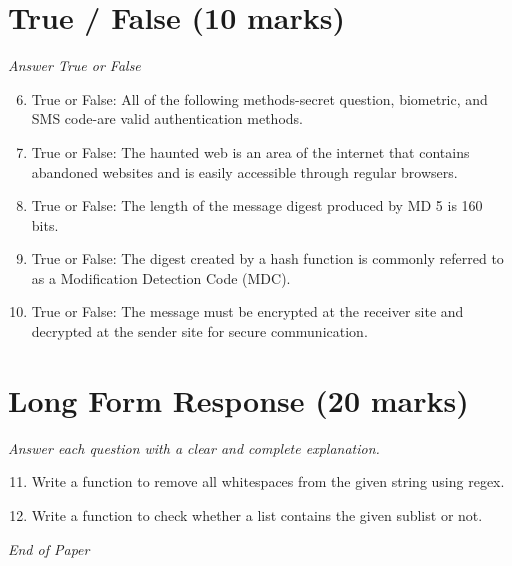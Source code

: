 \documentclass[12pt]{article}
\begin{document}
\section*{True / False (10 marks)}
\textit{Answer True or False}
\begin{enumerate}[label=\arabic*.]
\setcounter{enumi}{5}
\item True or False: All of the following methods-secret question, biometric, and SMS code-are valid authentication methods.
\item True or False: The haunted web is an area of the internet that contains abandoned websites and is easily accessible through regular browsers.
\item True or False: The length of the message digest produced by MD 5 is 160 bits.
\item True or False: The digest created by a hash function is commonly referred to as a Modification Detection Code (MDC).
\item True or False: The message must be encrypted at the receiver site and decrypted at the sender site for secure communication.
\end{enumerate}

\section*{Long Form Response (20 marks)}
\textit{Answer each question with a clear and complete explanation.}
\begin{enumerate}[label=\arabic*.]
\setcounter{enumi}{10}
\item Write a function to remove all whitespaces from the given string using regex.
\item Write a function to check whether a list contains the given sublist or not.
\end{enumerate}

\vfill
\noindent\textit{End of Paper}
\end{document}
